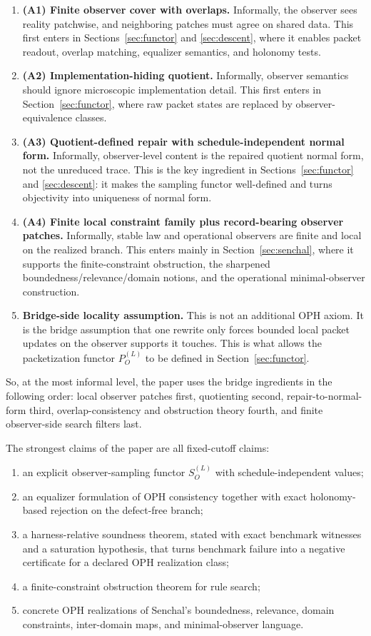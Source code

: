 \documentclass[11pt]{article}
\theoremstyle{remark}
\theoremstyle{plain}
\begin{document}
\begin{enumerate}[label=\textbf{\arabic*.},leftmargin=2em]
\item \textbf{(A1) Finite observer cover with overlaps.}
Informally, the observer sees reality patchwise, and neighboring patches must agree on shared data. This first enters in Sections~\ref{sec:functor} and \ref{sec:descent}, where it enables packet readout, overlap matching, equalizer semantics, and holonomy tests.
\item \textbf{(A2) Implementation-hiding quotient.}
Informally, observer semantics should ignore microscopic implementation detail. This first enters in Section~\ref{sec:functor}, where raw packet states are replaced by observer-equivalence classes.
\item \textbf{(A3) Quotient-defined repair with schedule-independent normal form.}
Informally, observer-level content is the repaired quotient normal form, not the unreduced trace. This is the key ingredient in Sections~\ref{sec:functor} and \ref{sec:descent}: it makes the sampling functor well-defined and turns objectivity into uniqueness of normal form.
\item \textbf{(A4) Finite local constraint family plus record-bearing observer patches.}
Informally, stable law and operational observers are finite and local on the realized branch. This enters mainly in Section~\ref{sec:senchal}, where it supports the finite-constraint obstruction, the sharpened boundedness/relevance/domain notions, and the operational minimal-observer construction.
\item \textbf{Bridge-side locality assumption.}
This is not an additional OPH axiom. It is the bridge assumption that one rewrite only forces bounded local packet updates on the observer supports it touches. This is what allows the packetization functor \(P_O^{(L)}\) to be defined in Section~\ref{sec:functor}.
\end{enumerate}

So, at the most informal level, the paper uses the bridge ingredients in the following order: local observer patches first, quotienting second, repair-to-normal-form third, overlap-consistency and obstruction theory fourth, and finite observer-side search filters last.

The strongest claims of the paper are all fixed-cutoff claims:
\begin{enumerate}[leftmargin=2em]
\item an explicit observer-sampling functor \(S_O^{(L)}\) with schedule-independent values;
\item an equalizer formulation of OPH consistency together with exact holonomy-based rejection on the defect-free branch;
\item a harness-relative soundness theorem, stated with exact benchmark witnesses and a saturation hypothesis, that turns benchmark failure into a negative certificate for a declared OPH realization class;
\item a finite-constraint obstruction theorem for rule search;
\item concrete OPH realizations of Senchal's boundedness, relevance, domain constraints, inter-domain maps, and minimal-observer language.
\end{enumerate}
\end{document}

